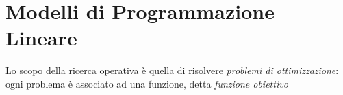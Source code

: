 \chapter{Modelli di Programmazione Lineare}

Lo scopo della ricerca operativa è quella di risolvere \emph{problemi di ottimizzazione}: ogni problema è associato ad una funzione, detta \emph{funzione obiettivo}